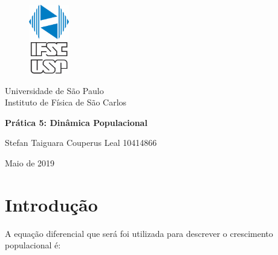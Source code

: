 \documentclass[a4paper, 12pt]{article}
\begin{document}

\begin{titlepage}

\begin{figure}[H]
\centering
\includegraphics[width=1.75cm]{IFSC_USP.png} %

\end{figure}
    \begin{center}
        Universidade de São Paulo \\

        Instituto de Física de São Carlos \\


\vspace{10pt}


        \vspace{85pt}


         \large\textbf{{Prática 5: Dinâmica Populacional }} %
        \vspace{160pt}

    \end{center}

    \begin{flushright}

         Stefan Taiguara Couperus Leal 10414866\\ %
    \end{flushright}

    \begin{center}
        \vspace{\fill}
        Maio de 2019 %
    \end{center}
\end{titlepage}

\newpage

\thispagestyle{empty}

\newpage
{}

\justifying
\tableofcontents

\newpage

\section{Introdução}
A equação diferencial que será foi utilizada para descrever o crescimento populacional é:
\end{document}
